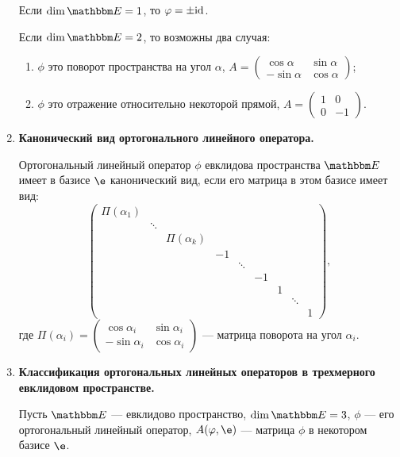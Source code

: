 \begin{enumerate}
Если $\dim \E = 1$, то $\varphi = \pm \mathrm{id}$.

Если $\dim \E = 2$, то возможны два случая:
\begin{enumerate}
\item $\phi$ это поворот пространства на угол $\alpha$, $A = \begin{pmatrix}
\cos\alpha & \sin\alpha \\
-\sin\alpha & \cos\alpha
\end{pmatrix}$;
\item $\phi$ это отражение относительно некоторой прямой, $A = \begin{pmatrix}
1 & 0 \\
0 & -1
\end{pmatrix}$.
\end{enumerate} 
\item \textbf{Канонический вид ортогонального линейного оператора.}

Ортогональный линейный оператор $\phi$ евклидова пространства $\E$ имеет в базисе $\e$ канонический вид, если его матрица в этом базисе имеет вид:
$$
\begin{pmatrix}
\Pi(\alpha_1)\\
&\ddots \\
&&\Pi(\alpha_k)\\
&&&-1\\
&&&&\ddots\\
&&&&&-1\\
&&&&&& 1\\
&&&&&&& \ddots \\
&&&&&&&& 1
\end{pmatrix},
$$
где $\Pi(\alpha_i) =  \begin{pmatrix}
\cos\alpha_i & \sin\alpha_i \\
-\sin\alpha_i & \cos\alpha_i
\end{pmatrix}$ --- матрица поворота на угол $\alpha_i$.

\item \textbf{Классификация ортогональных линейных операторов в трехмерного евклидовом пространстве.}

Пусть $\E$ --- евклидово пространство, $\dim \E = 3$, $\phi$ --- его ортогональный линейный оператор, $A(\phi, \e)$ --- матрица $\phi$ в некотором базисе $\e$.


\end{enumerate}
